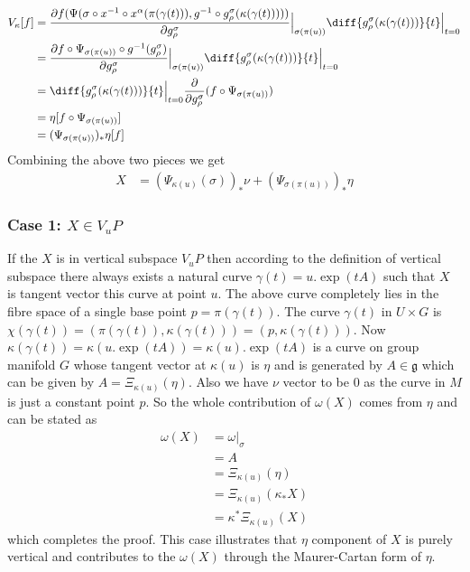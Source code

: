 \documentclass[12pt]{article}
\begin{document}
\begin{align*}
    V_{\kappa}[f] &= \frac{\partial f(\Psi(\sigma\circ x^{-1}\circ x^{\alpha}(\pi(\gamma(t))), g^{-1}\circ g^{\sigma}_{\rho}(\kappa(\gamma(t)))))}{\partial g^{\sigma}_{\rho}}\Bigr|_{\sigma(\pi(u))}\diff{g^{\sigma}_{\rho}(\kappa(\gamma(t)))}{t}\Bigr|_{t=0} \\
               &= \frac{\partial f\circ\Psi_{\sigma(\pi(u))}\circ g^{-1}(g^{\sigma}_{\rho})}{\partial g^{\sigma}_{\rho}}\Bigr|_{\sigma(\pi(u))}\diff{g^{\sigma}_{\rho}(\kappa(\gamma(t)))}{t}\Bigr|_{t=0} \\
               &= \diff{g^{\sigma}_{\rho}(\kappa(\gamma(t)))}{t}\Bigr|_{t=0}\frac{\partial}{\partial g^{\sigma}_{\rho}}(f\circ\Psi_{\sigma(\pi(u))}) \\
               &= \eta[f\circ\Psi_{\sigma(\pi(u))}] \\
               &= (\Psi_{\sigma(\pi(u))})_{\ast}\eta[f]
\end{align*}
Combining the above two pieces we get
\begin{align}
    X &= (\Psi_{\kappa(u)}(\sigma))_{\ast}\nu + (\Psi_{\sigma(\pi(u))})_{\ast}\eta
\end{align}

\subsubsection{Case 1: $X \in V_{u}P $ }
If the $X$ is in vertical subspace $V_{u}P $ then according to the definition of vertical subspace there always exists a natural curve $\gamma(t)=u.\exp(tA)$ such that $X$ is tangent vector this curve at point $u$. The above curve completely lies in the fibre space of a single base point $p = \pi(\gamma(t))$. The curve $\gamma(t) $ in $U\times G$ is $\chi(\gamma(t)) = (\pi(\gamma(t)), \kappa(\gamma(t))) = (p, \kappa(\gamma(t)))$. Now $\kappa(\gamma(t)) = \kappa(u.\exp(tA)) = \kappa(u).\exp(tA)$ is a curve on group manifold $G$ whose tangent vector at $\kappa(u)$ is $\eta$ and is generated by $A \in \mathfrak{g}$ which can be given by $A = \Xi_{\kappa(u)}(\eta)$. Also we have $\nu$ vector to be $0$ as the curve in $M$ is just a constant point $p$. So the whole contribution of $\omega(X)$ comes from $\eta$ and can be stated as
\begin{align*}
    \omega(X) &= \omega\Bigr|_{\sigma} \\
              &= A \\
              &= \Xi_{\kappa(u)}(\eta) \\
              &= \Xi_{\kappa(u)}(\kappa_{\ast}X) \\
              &= \kappa^{\ast}\Xi_{\kappa(u)}(X)
\end{align*} which completes the proof. This case illustrates that $\eta$ component of $X$ is purely vertical and contributes to the $\omega(X)$ through the Maurer-Cartan form of $\eta$.
\end{document}
